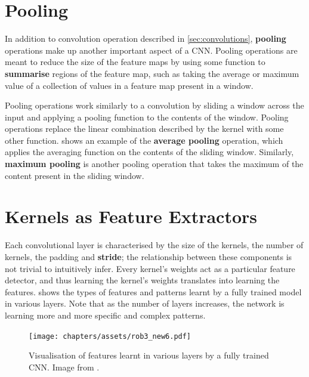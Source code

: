 \section{Pooling}\label{sec:conv-pooling}

In addition to convolution operation described in \cref{sec:convolutions}, \textbf{pooling} operations make up another important aspect of a CNN. Pooling operations are meant to reduce the size of the feature maps by using some function to \textbf{summarise} regions of the feature map, such as taking the average or maximum value of a collection of values in a feature map present in a window.

Pooling operations work similarly to a convolution by sliding a window across the input and applying a pooling function to the contents of the window. 
Pooling operations replace the linear combination described by the kernel with some other function.  shows an example of the \textbf{average pooling} operation, which applies the averaging function on the contents of the sliding window. Similarly, \textbf{maximum pooling} is another pooling operation that takes the maximum of the content present in the sliding window.


\newpage
\section{Kernels as Feature Extractors}\label{sec: kernel-feature-extractor}
Each convolutional layer is characterised by the size of the kernels, the number of kernels, the padding and \textbf{stride}; the relationship between these components is not trivial to intuitively infer. Every kernel's weights act as a particular feature detector, and thus learning the kernel's weights translates into learning the features.  shows the types of features and patterns learnt by a fully trained model in various layers. Note that as the number of layers increases, the network is learning more and more specific and complex patterns.

\begin{figure}[ht]
    \centering
    \captionsetup{justification=RaggedRight}
    \texttt{[image: chapters/assets/rob3\_new6.pdf]}
    \caption{Visualisation of features learnt in various layers by a fully trained CNN. Image from \textcite{Zeiler2013}.}
    \label{fig:feature-viz}
\end{figure}